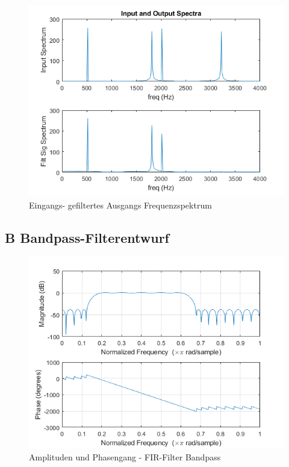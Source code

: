 \begin{figure}[h]
\centering
\includegraphics[width=0.7\linewidth]{./Bilder/Attachment_A2_fir_2b_Spektrum}
\caption{Eingangs- gefiltertes Ausgangs Frequenzspektrum}
\label{fig:Attachment_A2_fir_2b_Spektrum}
\end{figure}


\newpage
\subsection{B Bandpass-Filterentwurf}





\begin{figure}[h]
\centering
\includegraphics[width=0.7\linewidth]{./Bilder/Attachment_B_fir_3_Amplitudengang}
\caption{Amplituden und Phasengang - FIR-Filter Bandpass}
\label{fig:Attachment_B_fir_3_Amplitudengang}
\end{figure}

